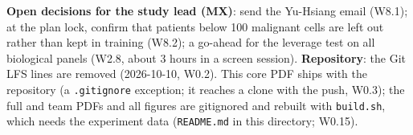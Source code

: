 \vspace{4pt}
\noindent\textbf{Open decisions for the study lead (MX)}: send the Yu-Hsiang email (W8.1); at the plan lock, confirm that patients below 100 malignant cells are left out rather than kept in training (W8.2); a go-ahead for the leverage test on all biological panels (W2.8, about 3 hours in a screen session).
\textbf{Repository}: the Git LFS lines are removed (2026-10-10, W0.2). This core PDF ships with the repository (a \texttt{.gitignore} exception; it reaches a clone with the push, W0.3); the full and team PDFs and all figures are gitignored and rebuilt with \texttt{build.sh}, which needs the experiment data (\texttt{README.md} in this directory; W0.15).



